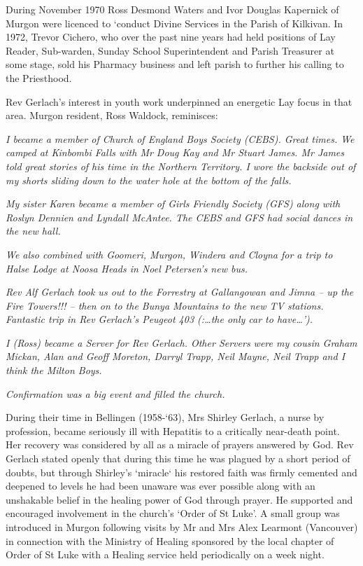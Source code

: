 During November 1970 Ross Desmond Waters and Ivor Douglas Kapernick of Murgon were licenced to `conduct Divine Services in the Parish of Kilkivan. In 1972, Trevor Cichero, who over the past nine years had held positions of Lay Reader, Sub-warden, Sunday School Superintendent and Parish Treasurer at some stage, sold his Pharmacy business and left parish to further his calling to the Priesthood.

Rev Gerlach's interest in youth work underpinned an energetic Lay focus in that area. Murgon resident, Ross Waldock, reminisces:

\emph{I became a member of Church of England Boys Society (CEBS). Great times. We camped at Kinbombi Falls with Mr Doug Kay and Mr Stuart James. Mr James told great stories of his time in the Northern Territory. I wore the backside out of my shorts sliding down to the water hole at the bottom of the falls.}

\emph{My sister Karen became a member of Girls Friendly Society (GFS) along with Roslyn Dennien and Lyndall McAntee. The CEBS and GFS had social dances in the new hall.}

\emph{We also combined with Goomeri, Murgon, Windera and Cloyna for a trip to Halse Lodge at Noosa Heads in Noel Petersen's new bus.}

\emph{Rev Alf Gerlach took us out to the Forrestry at Gallangowan and Jimna -- up the Fire Towers!!! -- then on to the Bunya Mountains to the new TV stations. Fantastic trip in Rev Gerlach's Peugeot 403 (:\ldots the only car to have\ldots').}

\emph{I (Ross) became a Server for Rev Gerlach. Other Servers were my cousin Graham Mickan, Alan and Geoff Moreton, Darryl Trapp, Neil Mayne, Neil Trapp and I think the Milton Boys.}

\emph{Confirmation was a big event and filled the church.}

During their time in Bellingen (1958-`63), Mrs Shirley Gerlach, a nurse by profession, became seriously ill with Hepatitis to a critically near-death point. Her recovery was considered by all as a miracle of prayers answered by God. Rev Gerlach stated openly that during this time he was plagued by a short period of doubts, but through Shirley's `miracle` his restored faith was firmly cemented and deepened to levels he had been unaware was ever possible along with an unshakable belief in the healing power of God through prayer. He supported and encouraged involvement in the church's `Order of St Luke'. A small group was introduced in Murgon following visits by Mr and Mrs Alex Learmont (Vancouver) in connection with the Ministry of Healing sponsored by the local chapter of Order of St Luke with a Healing service held periodically on a week night.

